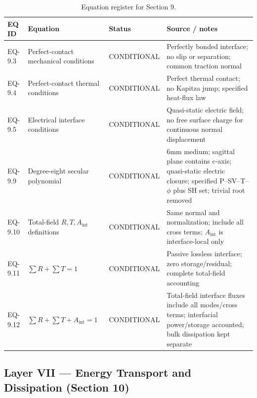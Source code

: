 \begin{table}[htbp]
\centering
\small
\caption{Equation register for Section 9.}
\label{tab:appA-sec9}
\begin{tabularx}{\textwidth}{@{}p{1.6cm}Y p{2.8cm}Y@{}}
\toprule
\textbf{EQ ID} & \textbf{Equation} & \textbf{Status} & \textbf{Source / notes} \\
\midrule
EQ-9.3 & Perfect-contact mechanical conditions & CONDITIONAL & Perfectly bonded interface; no slip or separation; common traction normal \\
EQ-9.4 & Perfect-contact thermal conditions & CONDITIONAL & Perfect thermal contact; no Kapitza jump; specified heat-flux law \\
EQ-9.5 & Electrical interface conditions & CONDITIONAL & Quasi-static electric field; no free surface charge for continuous normal displacement \\
EQ-9.9 & Degree-eight secular polynomial & CONDITIONAL & 6mm medium; sagittal plane contains c-axis; quasi-static electric closure; specified P--SV--T--$\phi$ plus SH set; trivial root removed \\
EQ-9.10 & Total-field $R,T,A_{\mathrm{int}}$ definitions & CONDITIONAL & Same normal and normalization; include all cross terms; $A_{\mathrm{int}}$ is interface-local only \\
EQ-9.11 & $\sum R+\sum T=1$ & CONDITIONAL & Passive lossless interface; zero storage/residual; complete total-field accounting \\
EQ-9.12 & $\sum R+\sum T+A_{\mathrm{int}}=1$ & CONDITIONAL & Total-field interface fluxes include all modes/cross terms; interfacial power/storage accounted; bulk dissipation kept separate \\
\bottomrule
\end{tabularx}
\end{table}

\subsection{Layer VII — Energy Transport and Dissipation (Section 10)}

